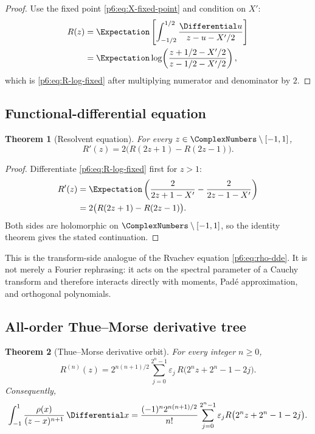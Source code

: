 \documentclass[11pt]{article}
\newtheorem{theorem}{Theorem}[section]
\theoremstyle{definition}
\theoremstyle{remark}
\newcommand{\eps}{\varepsilon}
\begin{document}
\begin{proof}
Use the fixed point \eqref{p6:eq:X-fixed-point} and condition on \(X'\):
\begin{align*}
 R(z)
 &=\Expectation\left[\int_{-1/2}^{1/2}
   \frac{\Differential u}{z-u-X'/2}\right]\\
 &=\Expectation\log\!\left(\frac{z+1/2-X'/2}{z-1/2-X'/2}\right),
\end{align*}
which is \eqref{p6:eq:R-log-fixed} after multiplying numerator and denominator by \(2\).
\end{proof}

\subsection{Functional-differential equation}

\begin{theorem}[Resolvent equation]\label{p6:thm:R-dde}
For every \(z\in\ComplexNumbers\setminus[-1,1]\),
\begin{equation}
 \boxed{R'(z)=2\bigl(R(2z+1)-R(2z-1)\bigr).}                \label{p6:eq:R-dde}
\end{equation}
\end{theorem}

\begin{proof}
Differentiate \eqref{p6:eq:R-log-fixed} first for \(z>1\):
\begin{align*}
 R'(z)
 &=\Expectation\left(\frac{2}{2z+1-X'}-\frac{2}{2z-1-X'}\right)\\
 &=2\bigl(R(2z+1)-R(2z-1)\bigr).
\end{align*}
Both sides are holomorphic on \(\ComplexNumbers\setminus[-1,1]\), so the identity theorem gives the
stated continuation.
\end{proof}

This is the transform-side analogue of the Rvachev equation \eqref{p6:eq:rho-dde}.  It is
not merely a Fourier rephrasing: it acts on the spectral parameter of a Cauchy transform and
therefore interacts directly with moments, Pad\'e approximation, and orthogonal polynomials.

\subsection{All-order Thue--Morse derivative tree}

\begin{theorem}[Thue--Morse derivative orbit]\label{p6:thm:R-derivative-tree}
For every integer \(n\ge0\),
\begin{equation}
 \boxed{
 R^{(n)}(z)=2^{n(n+1)/2}
 \sum_{j=0}^{2^n-1}\eps_j\,
 R\bigl(2^n z+2^n-1-2j\bigr).
 }                                                           \label{p6:eq:R-derivative-tree}
\end{equation}
Consequently,
\begin{equation}
 \int_{-1}^{1}\frac{\rho(x)}{(z-x)^{n+1}}\,\Differential x
 =\frac{(-1)^n2^{n(n+1)/2}}{n!}
 \sum_{j=0}^{2^n-1}\eps_j
 R\bigl(2^n z+2^n-1-2j\bigr).                               \label{p6:eq:R-kernel-tree}
\end{equation}
\end{theorem}
\end{document}
